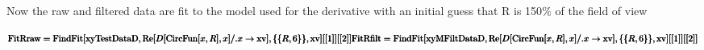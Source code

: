 Now the raw and filtered data are fit to the model used for the derivative with an initial guess that R is 150$\%$ of the field of view

\noindent\(\pmb{\text{FitRraw}=\text{FindFit}[\text{xyTestDataD},\text{Re}[D[ \text{CircFun}[x,R],x]\text{/.}x\to \text{xv}],\{\{R,6\}\},\text{xv}][[1]][[2]]}\\
\pmb{\text{FitRfilt}=\text{FindFit}[\text{xyMFiltDataD},\text{Re}[D[ \text{CircFun}[x,R],x]\text{/.}x\to \text{xv}],\{\{R,6\}\},\text{xv}][[1]][[2]]}\)

